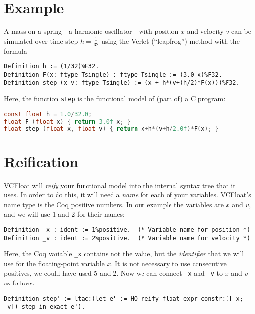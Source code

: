 \documentclass[article]{memoir}
\begin{document}
\chapter{Example}

A mass on a spring---a harmonic oscillator---with position $x$ and
velocity $v$ can be simulated over time-step $h=\frac{1}{32}$ using the
Verlet (``leapfrog'') method with the formula,

\begin{lstlisting}
Definition h := (1/32)%F32.
Definition F(x: ftype Tsingle) : ftype Tsingle := (3.0-x)%F32.  
Definition step (x v: ftype Tsingle) := (x + h*(v+(h/2)*F(x)))%F32.
\end{lstlisting}

Here, the function \lstinline{step} is the functional model of
(part of) a C program:

\begin{lstlisting}[language=C]
const float h = 1.0/32.0;
float F (float x) { return 3.0f-x; }
float step (float x, float v) { return x+h*(v+h/2.0f)*F(x); }
\end{lstlisting}

\chapter{Reification}

VCFloat will \emph{reify} your functional model into the internal
syntax tree that it uses.  In order to do this, it will need
a \emph{name} for each of your variables.
VCFloat's name type is the Coq positive numbers.
In our example the variables are $x$ and $v$, and
we will use 1 and 2 for their names:

\begin{lstlisting}
Definition _x : ident := 1%positive.  (* Variable name for position *)
Definition _v : ident := 2%positive.  (* Variable name for velocity *)
\end{lstlisting}

Here, the Coq variable \lstinline{_x} contains not the value,
but the \emph{identifier} that we will use for the floating-point
variable $x$.  It is not necessary to use consecutive positives,
we could have used 5 and 2.
Now we can connect \lstinline{_x} and
\lstinline{_v} to $x$ and $v$ as follows:

\begin{lstlisting}
Definition step' := ltac:(let e' := HO_reify_float_expr constr:([_x; _v]) step in exact e').
\end{lstlisting}
\end{document}
